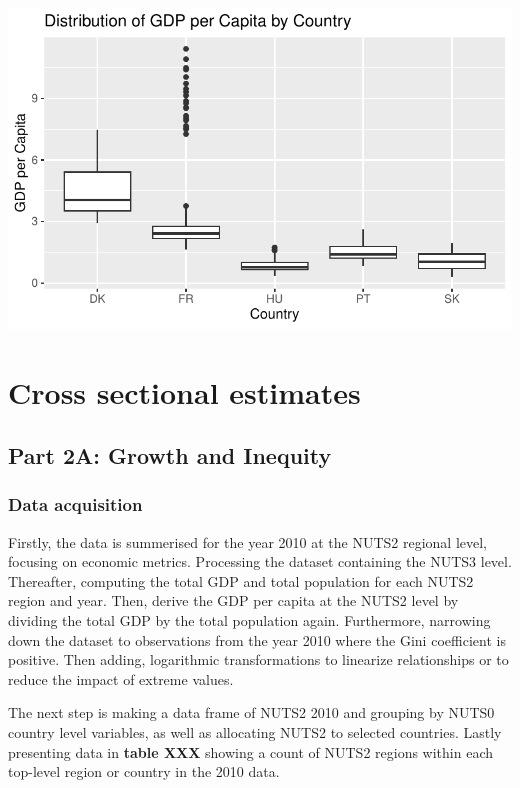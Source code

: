 \documentclass[
  a4paper,
  DIV=11,
  numbers=noendperiod]{scrartcl}
\begin{document}
\includegraphics{MSB104_GR_1_Final_Assignment_research_article_files/figure-pdf/unnamed-chunk-25-1.pdf}

\hypertarget{cross-sectional-estimates}{%
\section{Cross sectional estimates}\label{cross-sectional-estimates}}

\hypertarget{part-2a-growth-and-inequity}{%
\subsection{Part 2A: Growth and
Inequity}\label{part-2a-growth-and-inequity}}

\hypertarget{data-acquisition}{%
\subsubsection{\texorpdfstring{\textbf{Data
acquisition}}{Data acquisition}}\label{data-acquisition}}

Firstly, the data is summerised for the year 2010 at the NUTS2 regional
level, focusing on economic metrics. Processing the dataset containing
the NUTS3 level. Thereafter, computing the total GDP and total
population for each NUTS2 region and year. Then, derive the GDP per
capita at the NUTS2 level by dividing the total GDP by the total
population again. Furthermore, narrowing down the dataset to
observations from the year 2010 where the Gini coefficient is positive.
Then adding, logarithmic transformations to linearize relationships or
to reduce the impact of extreme values.

The next step is making a data frame of NUTS2 2010 and grouping by NUTS0
country level variables, as well as allocating NUTS2 to selected
countries. Lastly presenting data in \textbf{table XXX} showing a count
of NUTS2 regions within each top-level region or country in the 2010
data.
\end{document}
